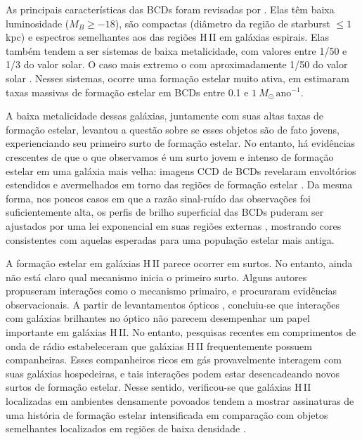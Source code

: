As principais características das BCDs foram revisadas por \cite{Thuan_1981}. Elas têm baixa luminosidade ($M_B \geq -18$), são compactas (diâmetro da região de starburst $\leq 1$ kpc) e espectros semelhantes aos das regiões H\,II em galáxias espirais. Elas também tendem a ser sistemas de baixa metalicidade, com valores entre 1/50 e 1/3 do valor solar. O caso mais extremo o com aproximadamente 1/50 do valor solar \citep{Skillman_1993, Vilchez_1998, Izotov_1998}. Nesses sistemas, ocorre uma formação estelar muito ativa, em \cite{Fanelli_1988} estimaram taxas massivas de formação estelar em BCDs entre 0.1 e $1~M_\odot\,\mathrm{ano}^{-1}$. 

A baixa metalicidade dessas galáxias, juntamente com suas altas taxas de formação estelar, levantou a questão sobre se esses objetos são de fato jovens, experienciando seu primeiro surto de formação estelar. No entanto, há evidências crescentes de que o que observamos é um surto jovem e intenso de formação estelar em uma galáxia mais velha: imagens CCD de BCDs revelaram envoltórios estendidos e avermelhados em torno das regiões de formação estelar \citep{Loose_1985, Kunth_1985}. Da mesma forma, nos poucos casos em que a razão sinal-ruído das observações foi suficientemente alta, os perfis de brilho superficial das BCDs puderam ser ajustados por uma lei exponencial em suas regiões externas \citep{James_1994, Telles_1995, Papaderos_1996, Cairos_1998}, mostrando cores consistentes com aquelas esperadas para uma população estelar mais antiga.

A formação estelar em galáxias H\,II parece ocorrer em surtos. No entanto, ainda não está claro qual mecanismo inicia o primeiro surto. Alguns autores \citep{Brinks_1988, Brinks_1990, Campos_1991, Campos_1993} propuseram interações como o mecanismo primairo, e procuraram evidências observacionais. A partir de levantamentos ópticos \citep{Campos_1993, Telles_1995}, concluiu-se que interações com galáxias brilhantes no óptico não parecem desempenhar um papel importante em galáxias H\,II. No entanto, pesquisas recentes em comprimentos de onda de rádio \citep{Brinks_1990, Taylor_1993, Taylor_1995, Taylor_1996} estabeleceram que galáxias H\,II frequentemente possuem companheiras. Esses companheiros ricos em gás provavelmente interagem com suas galáxias hospedeiras, e tais interações podem estar desencadeando novos surtos de formação estelar. Nesse sentido, verificou-se que galáxias H\,II localizadas em ambientes densamente povoados tendem a mostrar assinaturas de uma história de formação estelar intensificada em comparação com objetos semelhantes localizados em regiões de baixa densidade \citep{Vilchez_1995, Vilchez_1997, Telles_1995}.


